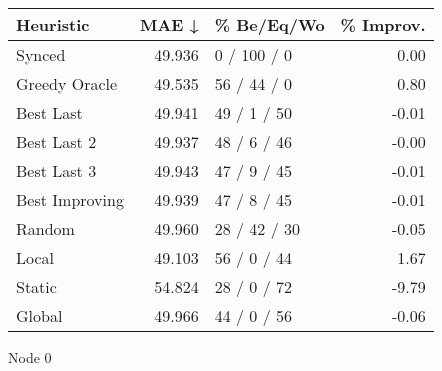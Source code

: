 \begin{tabular}{lrlr}
\toprule
\textbf{Heuristic} & \textbf{MAE ↓} & \textbf{\% Be/Eq/Wo} & \textbf{\% Improv.} \\
\midrule
            Synced &         49.936 &          0 / 100 / 0 &                0.00 \\
     Greedy Oracle &         49.535 &          56 / 44 / 0 &                0.80 \\
         Best Last &         49.941 &          49 / 1 / 50 &               -0.01 \\
       Best Last 2 &         49.937 &          48 / 6 / 46 &               -0.00 \\
       Best Last 3 &         49.943 &          47 / 9 / 45 &               -0.01 \\
    Best Improving &         49.939 &          47 / 8 / 45 &               -0.01 \\
            Random &         49.960 &         28 / 42 / 30 &               -0.05 \\
             Local &         49.103 &          56 / 0 / 44 &                1.67 \\
            Static &         54.824 &          28 / 0 / 72 &               -9.79 \\
            Global &         49.966 &          44 / 0 / 56 &               -0.06 \\
\bottomrule
\end{tabular}
\caption{Node 0}
\label{tab:iid_lr01_le2_bs2_0}
